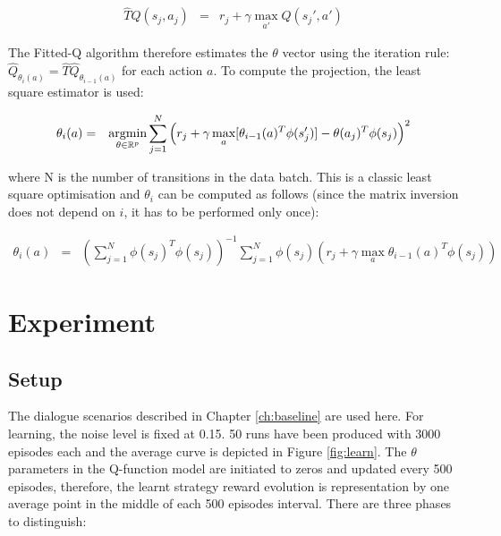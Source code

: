 				\begin{eqnarray}
					\hat{T} Q(s_j,a_j) & = & r_j + \gamma \max_{a'} Q(s_j',a')
				\end{eqnarray}
            
      	The Fitted-Q algorithm therefore estimates the $\theta$ vector using the iteration rule: $\hat{Q}_{\theta_i (a)} = \hat{T} \hat{Q}_{\theta_{i-1} (a)}$ for each action $a$. To compute the projection, the least square estimator is used:
        
				\begin{eqnarray}
					\theta_i (a) & = & \mathop{\hbox{argmin}}_{\theta \in \mathbb{R}^p} \sum_{j=1}^N \left(r_j + \gamma \mathop{\hbox{max}}_a [\theta_{i-1}(a)^T \phi(s_j')] - \theta (a_j)^T \phi(s_j) \right)^2
				\end{eqnarray}
            
      	where N is the number of transitions in the data batch. This is a classic least square optimisation and $\theta_i$ can be computed as follows (since the matrix inversion does not depend on $i$, it has to be performed only once):
        
				\begin{eqnarray}
					\theta_i (a) & = & \left( \sum_{j=1}^N \phi(s_j)^T \phi(s_j) \right)^{-1} \sum_{j=1}^N \phi(s_j) \left( r_j + \gamma \max_a \theta_{i-1}(a)^T \phi(s_j) \right)
				\end{eqnarray}

\section{Experiment}
	
    \subsection{Setup}

		The dialogue scenarios described in Chapter \ref{ch:baseline} are used here. For learning, the noise level is fixed at 0.15. 50 runs have been produced with 3000 episodes each and the average curve is depicted in Figure \ref{fig:learn}. The $\theta$ parameters in the Q-function model are initiated to zeros and updated every 500 episodes, therefore, the learnt strategy reward evolution is representation by one average point in the middle of each 500 episodes interval. There are three phases to distinguish:
        
